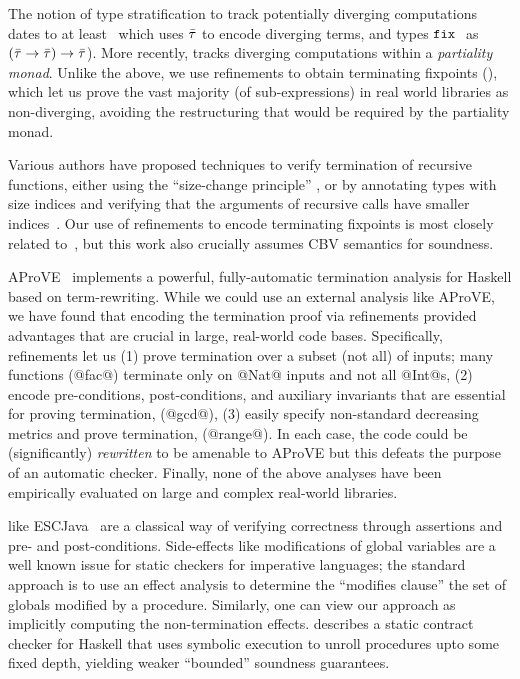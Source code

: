 The notion of type stratification to track potentially 
diverging computations dates to at least~\citep{ConstableS87} 
which uses $\bar{\tau}$ to encode diverging terms, and types 
$\mathtt{fix}\ {}$ as $(\bar{\tau}\rightarrow\bar{\tau}) \rightarrow \bar{\tau}$).
%
More recently, \cite{Capretta05} tracks diverging 
computations within a \emph{partiality monad}.
%
Unlike the above, we use refinements to 
obtain terminating fixpoints (\etfix{}), which let us prove 
the vast majority (of sub-expressions) in real world libraries 
as non-diverging, avoiding the restructuring that would
be required by the partiality monad.

Various authors have proposed techniques to verify termination 
of recursive functions, either using the ``size-change principle'' 
\cite{JonesB04,Sereni05}, or by annotating types with size indices 
and verifying that the arguments of recursive calls have smaller 
indices~\cite{HughesParetoSabry96,BartheTermination}.
%
Our use of refinements to encode terminating fixpoints is most 
closely related to~\cite{XiTerminationLICS01}, but this work 
also crucially assumes CBV semantics for soundness.

AProVE~\cite{Giesl11} implements a powerful, fully-automatic
termination analysis for Haskell based on term-rewriting.
%
While we could use an external analysis like AProVE,
we have found that encoding the termination proof via 
refinements provided advantages that are crucial in 
large, real-world code bases. Specifically, refinements
let us
%
(1) prove termination over a subset 
    (not all) of inputs; many functions (\eg @fac@) 
    terminate only on @Nat@ inputs and not all @Int@s,
%
(2) encode pre-conditions, 
    post-conditions, and auxiliary invariants that 
    are essential for proving termination, (\eg @gcd@),
%
(3) easily specify non-standard 
    decreasing metrics and prove termination, (\eg @range@).
%
In each case, the code could be (significantly) 
\emph{rewritten} to be amenable to AProVE but this defeats
the purpose of an automatic checker.
%
Finally, none of the above analyses have been empirically
evaluated on large and complex real-world libraries.


like ESCJava~\cite{ESCJava} are a classical way of verifying 
correctness through assertions and pre- and post-conditions. 
%
Side-effects like modifications of global variables are a 
well known issue for static checkers for imperative languages;
the standard approach is to use an effect analysis to determine
the ``modifies clause'' \ie the set of globals modified by a procedure.
%
Similarly, one can view our approach as implicitly computing 
the non-termination effects.
%
%
\cite{XuPOPL09} describes a static contract checker for 
Haskell that uses symbolic execution to unroll procedures
upto some fixed depth, yielding weaker ``bounded'' soundness
guarantees.
% 

